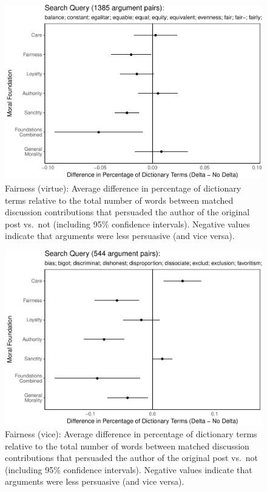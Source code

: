 \documentclass[12pt,]{article}
\begin{document}
\begin{figure}
\centering
\includegraphics{prelim_files/figure-latex/fairness virtue-1.pdf}
\caption{Fairness (virtue): Average difference in percentage of
dictionary terms relative to the total number of words between matched
discussion contributions that persuaded the author of the original post
vs.~not (including 95\% confidence intervals). Negative values indicate
that arguments were less persuasive (and vice versa).}
\end{figure}

\begin{figure}
\centering
\includegraphics{prelim_files/figure-latex/fairness vice-1.pdf}
\caption{Fairness (vice): Average difference in percentage of dictionary
terms relative to the total number of words between matched discussion
contributions that persuaded the author of the original post vs.~not
(including 95\% confidence intervals). Negative values indicate that
arguments were less persuasive (and vice versa).}
\end{figure}
\end{document}
